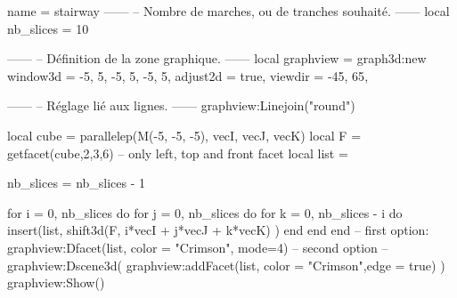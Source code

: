 \documentclass[border = 3pt]{standalone}
\begin{document}
\begin{luadraw}{name = stairway}
------
-- Nombre de marches, ou de tranches souhaité.
------
local nb_slices = 10

------
-- Définition de la zone graphique.
------
local graphview = graph3d:new{
  window3d = {-5, 5, -5, 5, -5, 5},
  adjust2d = true,
  viewdir  = {-45, 65},
}

------
-- Réglage lié aux lignes.
------
graphview:Linejoin("round")

local cube = parallelep(M(-5, -5, -5), vecI, vecJ, vecK)
local F = getfacet(cube,{2,3,6}) -- only left, top and front facet
local list = {}

nb_slices = nb_slices - 1

for i = 0, nb_slices do
  for j = 0, nb_slices do
    for k = 0, nb_slices - i do
      insert(list, shift3d(F, i*vecI + j*vecJ + k*vecK) )
    end
  end
end
-- first option:
graphview:Dfacet(list, {color = "Crimson", mode=4})
-- second option
--graphview:Dscene3d( graphview:addFacet(list, {color = "Crimson",edge = true}) )
graphview:Show()
\end{luadraw}
\end{document}
